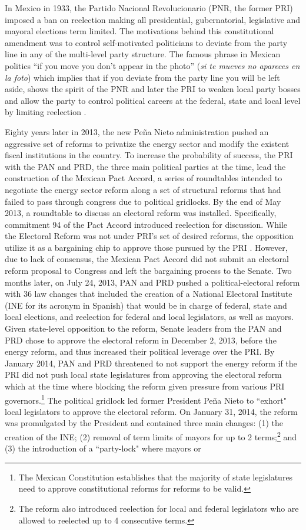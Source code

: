 \documentclass[12pt]{amsart}
\numberwithin{equation}{section}
\theoremstyle{definition}
\theoremstyle{definition}
\theoremstyle{definition}
\begin{document}
In Mexico in 1933, the Partido Nacional Revolucionario (PNR, the former PRI) imposed a ban on reelection making all presidential, gubernatorial, legislative and mayoral elections term limited. The motivations behind this constitutional amendment was to control self-motivated politicians to deviate from the party line in any of the multi-level party structure. The famous phrase in Mexican politics ``if you move you don't appear in the photo'' (\emph{si te mueves no apareces en la foto}) which implies that if you deviate from the party line you will be left aside, shows the spirit of the PNR and later the PRI to weaken  local party bosses and allow the party to control political careers at the federal, state and local level by limiting reelection \citep{weldon_2003}. 

Eighty years later in 2013, the new Peña Nieto administration pushed an aggressive set of reforms to privatize the energy sector and modify the existent fiscal institutions in the country. To increase the probability of success, the PRI with the PAN and PRD, the three main political parties at the time, lead the construction of the Mexican Pact Accord, a series of roundtables intended to negotiate the energy sector reform along a set of structural reforms that had failed to pass through congress due to political gridlocks. By the end of May 2013, a roundtable to discuss an electoral reform was installed. Specifically, commitment 94 of the Pact Accord introduced reelection for discussion. While the Electoral Reform was not under PRI's set of desired reforms, the opposition utilize it as a bargaining chip to approve those pursued by the PRI \citep{zamitiz_2017}. However, due to lack of consensus, the Mexican Pact Accord did not submit an electoral reform proposal to Congress and left the bargaining process to the Senate. Two months later, on July 24, 2013, PAN and PRD pushed a political-electoral reform with 36 law changes that included  the creation of a National Electoral Institute (INE for its acronym in Spanish) that would be in charge of federal, state and local elections, and reelection for federal and local legislators, as well as mayors. Given state-level opposition to the reform, Senate leaders from the PAN and PRD chose to approve the electoral reform in December 2, 2013, before the energy reform, and thus increased their political leverage over the PRI. By January 2014, PAN and PRD threatened to not support the energy reform  if the PRI did not push local state legislatures from approving the electoral reform which at the time where blocking the reform given pressure from various PRI governors.\footnote{The Mexican Constitution establishes that the majority of state legislatures need to approve constitutional reforms for reforms to be valid.} The political gridlock led former President Peña Nieto to ``exhort" local legislators to approve the electoral reform. On January 31, 2014, the reform was promulgated by the President and contained three main changes: (1) the creation of the INE; (2) removal of term limits of mayors for up to 2 terms;\footnote{The reform also introduced reelection for local and federal legislators who are allowed to reelected up to 4 consecutive terms.} and (3) the introduction of a ``party-lock"	where mayors or 
\end{document}
